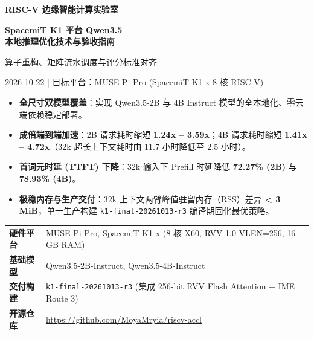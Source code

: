 \documentclass[10pt,a4paper,fontset=none]{ctexart}
\begin{document}
\begin{titlepage}
\vspace*{10mm}
{\large\textcolor{primary}{\textbf{RISC-V 边缘智能计算实验室}}}\par
\vspace{8mm}
{\Huge\bfseries\color{primary} SpacemiT K1 平台 Qwen3.5\\[4pt]本地推理优化技术与验收指南\par}
\vspace{6mm}
{\Large\color{secondary} 算子重构、矩阵流水调度与评分标准对齐\par}
\vspace{8mm}
{\large 2026-10-22 | 目标平台：MUSE-Pi-Pro (SpacemiT K1-x 8 核 RISC-V)\par}
\vspace{10mm}

\begin{tcolorbox}[colback=lightgray,colframe=primary,arc=3mm,title=\textbf{核心成果摘要}]
\begin{itemize}
  \item \textbf{全尺寸双模型覆盖}：实现 Qwen3.5-2B 与 4B Instruct 模型的全本地化、零云端依赖稳定部署。
  \item \textbf{成倍端到端加速}：2B 请求耗时缩短 \textbf{1.24x -- 3.59x}；4B 请求耗时缩短 \textbf{1.41x -- 4.72x}（32k 超长上下文耗时由 11.7 小时降低至 2.5 小时）。
  \item \textbf{首词元时延 (TTFT) 下降}：32k 输入下 Prefill 时延降低 \textbf{72.27\% (2B)} 与 \textbf{78.93\% (4B)}。
  \item \textbf{极稳内存与生产交付}：32k 上下文两臂峰值驻留内存（RSS）差异 \textbf{< 3 MiB}，单一生产构建 \texttt{k1-final-20261013-r3} 编译期固化最优策略。
\end{itemize}
\end{tcolorbox}

\vfill
\begin{tabular}{@{}ll@{}}
\textbf{硬件平台} & MUSE-Pi-Pro, SpacemiT K1-x (8 核 X60, RVV 1.0 VLEN=256, 16 GB RAM) \\
\textbf{基础模型} & Qwen3.5-2B-Instruct, Qwen3.5-4B-Instruct \\
\textbf{交付构建} & \texttt{k1-final-20261013-r3} (集成 256-bit RVV Flash Attention + IME Route 3) \\
\textbf{开源仓库} & \url{https://github.com/MoyaMryia/riscv-accl} \\
\end{tabular}
\vspace{6mm}
\end{titlepage}
\end{document}
